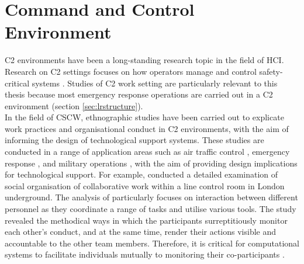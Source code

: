 

\section{Command and Control Environment}\label{sec:LRC2}
\acf{C2} environments have been a long-standing research topic in the field of \acf{HCI}. Research on \ac{C2} settings focuses on how operators manage and control safety-critical systems \citep{Fischer2015}. Studies of \ac{C2} work setting are particularly relevant to this thesis because most emergency response operations are carried out in a \ac{C2} environment (section \ref{sec:lrstructure}). \\

In the field of \ac{CSCW}, ethnographic studies have been carried out to explicate work practices and organisational conduct in \ac{C2} environments, with the aim of informing the design of technological support systems. These studies are conducted in a range of application areas such as air traffic control \citep{RichardH.R.HarperJohnA.Hughes1989}, emergency response \citep{Fischer2015} , and military operations \citep{Tolcher2005}, with the aim of providing design implications for technological support. For example, \citep{Heath1992} conducted a detailed examination of social organisation of collaborative work within a line control room in London underground. The analysis of \citep{Heath1992} particularly focuses on interaction between different personnel as they coordinate a range of tasks and utilise various tools. The study revealed the methodical ways in which the participants surreptitiously monitor each other's conduct, and at the same time, render their actions visible and accountable to the other team members. Therefore, it is critical for computational systems to facilitate individuals mutually to monitoring their co-participants \citep{Heath1992}.\\

